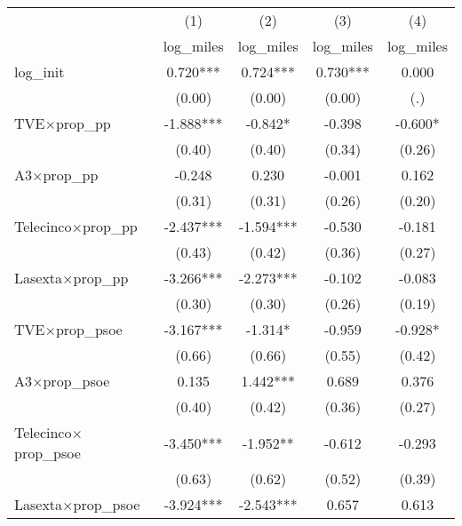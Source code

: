 \begin{tabular}{l*{4}{c}}
\toprule
                    &\multicolumn{1}{c}{(1)}&\multicolumn{1}{c}{(2)}&\multicolumn{1}{c}{(3)}&\multicolumn{1}{c}{(4)}\\
                    &\multicolumn{1}{c}{log\_miles}&\multicolumn{1}{c}{log\_miles}&\multicolumn{1}{c}{log\_miles}&\multicolumn{1}{c}{log\_miles}\\
\midrule
log\_init            &       0.720***&       0.724***&       0.730***&       0.000   \\
                    &      (0.00)   &      (0.00)   &      (0.00)   &         (.)   \\
TVE$\times$prop\_pp  &      -1.888***&      -0.842*  &      -0.398   &      -0.600*  \\
                    &      (0.40)   &      (0.40)   &      (0.34)   &      (0.26)   \\
A3$\times$prop\_pp   &      -0.248   &       0.230   &      -0.001   &       0.162   \\
                    &      (0.31)   &      (0.31)   &      (0.26)   &      (0.20)   \\
Telecinco$\times$prop\_pp&      -2.437***&      -1.594***&      -0.530   &      -0.181   \\
                    &      (0.43)   &      (0.42)   &      (0.36)   &      (0.27)   \\
Lasexta$\times$prop\_pp&      -3.266***&      -2.273***&      -0.102   &      -0.083   \\
                    &      (0.30)   &      (0.30)   &      (0.26)   &      (0.19)   \\
TVE$\times$prop\_psoe&      -3.167***&      -1.314*  &      -0.959   &      -0.928*  \\
                    &      (0.66)   &      (0.66)   &      (0.55)   &      (0.42)   \\
A3$\times$prop\_psoe &       0.135   &       1.442***&       0.689   &       0.376   \\
                    &      (0.40)   &      (0.42)   &      (0.36)   &      (0.27)   \\
Telecinco$\times$prop\_psoe&      -3.450***&      -1.952** &      -0.612   &      -0.293   \\
                    &      (0.63)   &      (0.62)   &      (0.52)   &      (0.39)   \\
Lasexta$\times$prop\_psoe&      -3.924***&      -2.543***&       0.657   &       0.613   \\

\end{tabular}
